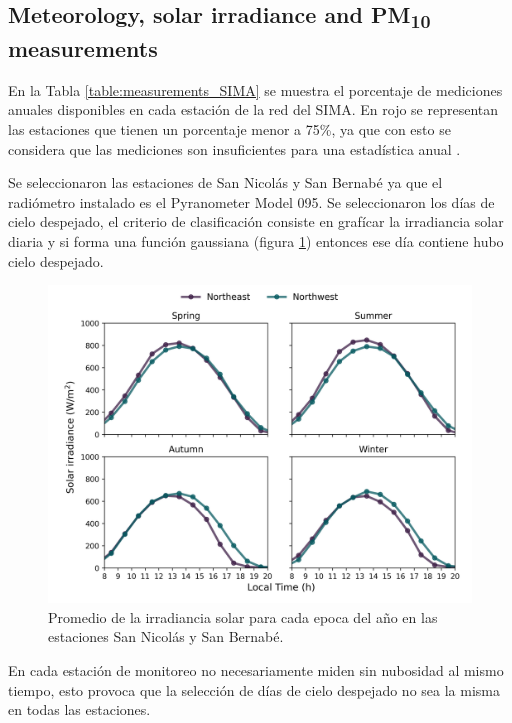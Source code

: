 \subsection{Meteorology, solar irradiance and PM\textsubscript{10} measurements}
En la Tabla \ref{table:measurements_SIMA} se muestra el porcentaje de mediciones anuales disponibles en cada estación de la red del SIMA. En rojo se representan las estaciones que tienen un porcentaje menor a 75\%, ya que con esto se considera que las mediciones son insuficientes para una estadística anual \cite{molina2019}.

Se seleccionaron las estaciones de San Nicolás y San Bernabé ya que el radiómetro instalado es el Pyranometer Model 095. Se seleccionaron los días de cielo despejado, el criterio de clasificación consiste en grafícar la irradiancia solar diaria y si forma una función gaussiana (figura \ref{fig:clear_days}) entonces ese día contiene hubo cielo despejado.
\begin{figure}[H]
    \centering
    \includegraphics[scale=0.5]{images/Clear_days.png}
    \caption{Promedio de la irradiancia solar para cada epoca del año en las estaciones San Nicolás y San Bernabé.}
    \label{fig:clear_days}
\end{figure}
En cada estación de monitoreo no necesariamente miden sin nubosidad al mismo tiempo, esto provoca que la selección de días de cielo despejado no sea la misma en todas las estaciones.